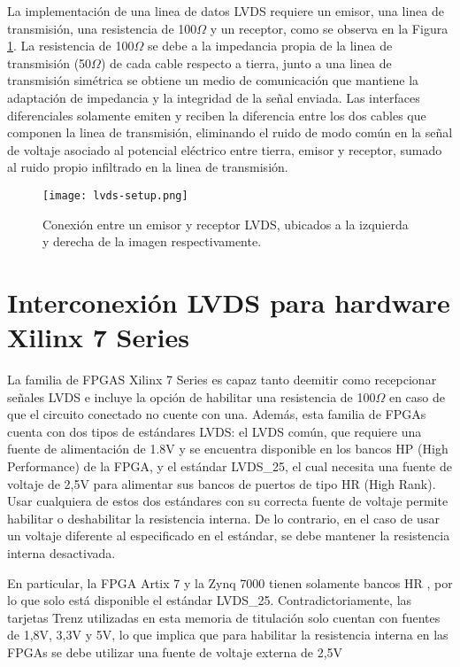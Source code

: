 	La implementación de una linea de datos LVDS requiere un emisor, una linea de transmisión, una resistencia de 100$\Omega$ y un receptor, como se observa en la Figura \ref{fig:lvds-setup}. La resistencia de 100$\Omega$ se debe a la impedancia propia de la linea de transmisión (50$\Omega$) de cada cable respecto a tierra, junto a una linea de transmisión simétrica se obtiene un medio de comunicación que mantiene la adaptación de impedancia y la integridad de la señal enviada. Las interfaces diferenciales solamente emiten y reciben la diferencia entre los dos cables que componen la linea de transmisión, eliminando el ruido de modo común en la señal de voltaje asociado al potencial eléctrico entre tierra, emisor y receptor, sumado al ruido propio infiltrado en la linea de transmisión.
	
	
	\begin{figure}[ht]
		\centering
		\texttt{[image: lvds-setup.png]}
		\caption{Conexión entre un emisor y receptor LVDS, ubicados a la izquierda y derecha de la imagen respectivamente\cite{Xilinx7UG471}.}
		\label{fig:lvds-setup}
	\end{figure}


\section{Interconexión LVDS para hardware Xilinx 7 Series}

	La familia de FPGAS Xilinx 7 Series\cite{Xilinx20147Guide} es capaz tanto deemitir como recepcionar señales LVDS e incluye la opción de habilitar una resistencia de 100$\Omega$ en caso de que el circuito conectado no cuente con una. Además, esta familia de FPGAs cuenta con dos tipos de estándares LVDS\cite{Xilinx2011Artix-7Characteristics}: el LVDS común, que requiere una fuente de alimentación de 1.8V y se encuentra disponible en los bancos HP (High Performance) de la FPGA, y el estándar LVDS\_25, el cual necesita una fuente de voltaje de 2,5V para alimentar sus bancos de puertos de tipo HR (High Rank). Usar cualquiera de estos dos estándares con su correcta fuente de voltaje permite habilitar o deshabilitar la resistencia interna. De lo contrario, en el caso de usar un voltaje diferente al especificado en el estándar, se debe mantener la resistencia interna desactivada\cite{Xilinx7Banks}.
	
	En particular, la FPGA Artix 7 y la Zynq 7000 tienen solamente bancos HR \cite{Xilinx2011Artix-7Characteristics}, por lo que solo está disponible el estándar LVDS\_25. Contradictoriamente, las tarjetas Trenz utilizadas en esta memoria de titulación solo cuentan con fuentes de 1,8V, 3,3V y 5V, lo que implica que para habilitar la resistencia interna en las FPGAs se debe utilizar una fuente de voltaje externa de 2,5V

